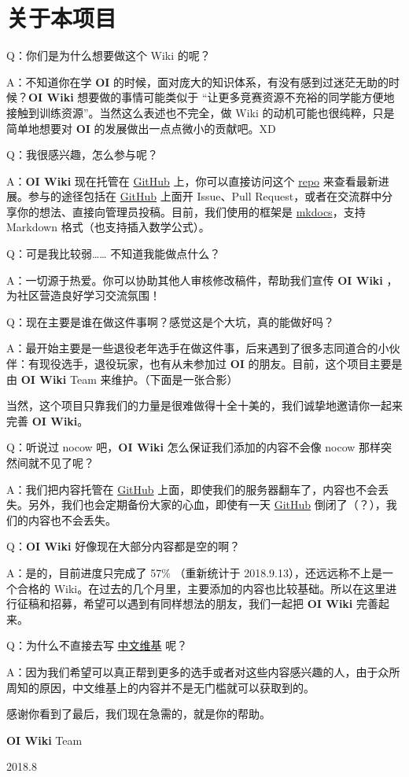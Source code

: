 
\section{关于本项目}

Q：你们是为什么想要做这个 Wiki 的呢？

A：不知道你在学 \textbf{OI} 的时候，面对庞大的知识体系，有没有感到过迷茫无助的时候？\textbf{OI Wiki} 想要做的事情可能类似于 “让更多竞赛资源不充裕的同学能方便地接触到训练资源”。当然这么表述也不完全，做 Wiki 的动机可能也很纯粹，只是简单地想要对 \textbf{OI} 的发展做出一点点微小的贡献吧。XD

Q：我很感兴趣，怎么参与呢？

A：\textbf{OI Wiki} 现在托管在 \href{https://github.com/24OI/OI-wiki}{GitHub} 上，你可以直接访问这个 \href{https://github.com/24OI/OI-wiki}{repo} 来查看最新进展。参与的途径包括在 \href{https://github.com/24OI/OI-wiki}{GitHub} 上面开 Issue、Pull Request，或者在交流群中分享你的想法、直接向管理员投稿。目前，我们使用的框架是 \href{https://mkdocs.readthedocs.io}{mkdocs}，支持 Markdown 格式（也支持插入数学公式）。

Q：可是我比较弱…… 不知道我能做点什么？

A：一切源于热爱。你可以协助其他人审核修改稿件，帮助我们宣传 \textbf{OI Wiki} ，为社区营造良好学习交流氛围！

Q：现在主要是谁在做这件事啊？感觉这是个大坑，真的能做好吗？

A：最开始主要是一些退役老年选手在做这件事，后来遇到了很多志同道合的小伙伴：有现役选手，退役玩家，也有从未参加过 \textbf{OI} 的朋友。目前，这个项目主要是由 \textbf{OI Wiki} Team 来维护。（下面是一张合影）



当然，这个项目只靠我们的力量是很难做得十全十美的，我们诚挚地邀请你一起来完善 \textbf{OI Wiki}。

Q：听说过 nocow 吧，\textbf{OI Wiki} 怎么保证我们添加的内容不会像 nocow 那样突然间就不见了呢？

A：我们把内容托管在 \href{https://github.com/24OI/OI-wiki}{GitHub} 上面，即使我们的服务器翻车了，内容也不会丢失。另外，我们也会定期备份大家的心血，即使有一天 \href{https://github.com/24OI/OI-wiki}{GitHub} 倒闭了（？），我们的内容也不会丢失。

Q：\textbf{OI Wiki} 好像现在大部分内容都是空的啊？

A：是的，目前进度只完成了 57\% （重新统计于 2018.9.13），还远远称不上是一个合格的 Wiki。在过去的几个月里，主要添加的内容也比较基础。所以在这里进行征稿和招募，希望可以遇到有同样想法的朋友，我们一起把 \textbf{OI Wiki} 完善起来。

Q：为什么不直接去写 \href{https://zh.wikipedia.org/}{中文维基} 呢？

A：因为我们希望可以真正帮到更多的选手或者对这些内容感兴趣的人，由于众所周知的原因，中文维基上的内容并不是无门槛就可以获取到的。

\hr

感谢你看到了最后，我们现在急需的，就是你的帮助。

\textbf{OI Wiki} Team

2018.8

